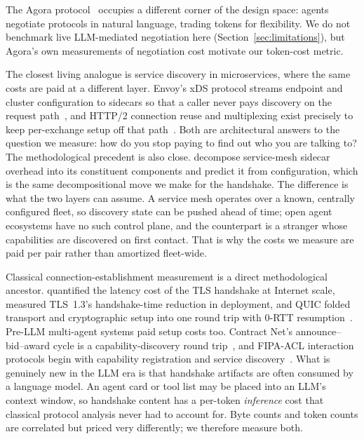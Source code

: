 \documentclass[10pt]{article}
\begin{document}
The Agora protocol~\citep{marro2024agora} occupies a different corner of
the design space: agents negotiate protocols in natural language, trading
tokens for flexibility. We do not benchmark live LLM-mediated negotiation
here (Section~\ref{sec:limitations}), but Agora's own measurements of
negotiation cost motivate our token-cost metric.

The closest living analogue is service discovery in microservices, where
the same costs are paid at a different layer. Envoy's xDS protocol
streams endpoint and cluster configuration to sidecars so that a caller
never pays discovery on the request path~\citep{envoy2026xds}, and
HTTP/2 connection reuse and multiplexing exist precisely to keep
per-exchange setup off that path~\citep{thomson2022http2}. Both are
architectural answers to the question we measure: how do you stop paying
to find out who you are talking to? The methodological precedent is also
close. \citet{zhu2023meshinsight} decompose service-mesh sidecar
overhead into its constituent components and predict it from
configuration, which is the same decompositional move we make for the
handshake. The difference is what the two layers can assume. A service
mesh operates over a known, centrally configured fleet, so discovery
state can be pushed ahead of time; open agent ecosystems have no such
control plane, and the counterpart is a stranger whose capabilities are
discovered on first contact. That is why the costs we measure are paid
per pair rather than amortized fleet-wide.

Classical connection-establishment measurement is a direct methodological
ancestor. \citet{naylor2014cost} quantified the latency cost of the TLS
handshake at Internet scale, \citet{lee2021tls} measured TLS~1.3's
handshake-time reduction in deployment, and QUIC folded transport and
cryptographic setup into one round trip with 0-RTT
resumption~\citep{iyengar2021quic}. Pre-LLM multi-agent systems paid
setup costs too. Contract Net's announce--bid--award cycle is a
capability-discovery round trip~\citep{smith1980contractnet}, and
FIPA-ACL interaction protocols begin with capability registration and
service discovery~\citep{fipa2002acl}. What is genuinely new in the LLM
era is that handshake artifacts are often consumed by a language model.
An agent card or tool list may be placed into an LLM's context window, so
handshake content has a per-token \emph{inference} cost that classical
protocol analysis never had to account for. Byte counts and token counts
are correlated but priced very differently; we therefore measure both.
\end{document}
